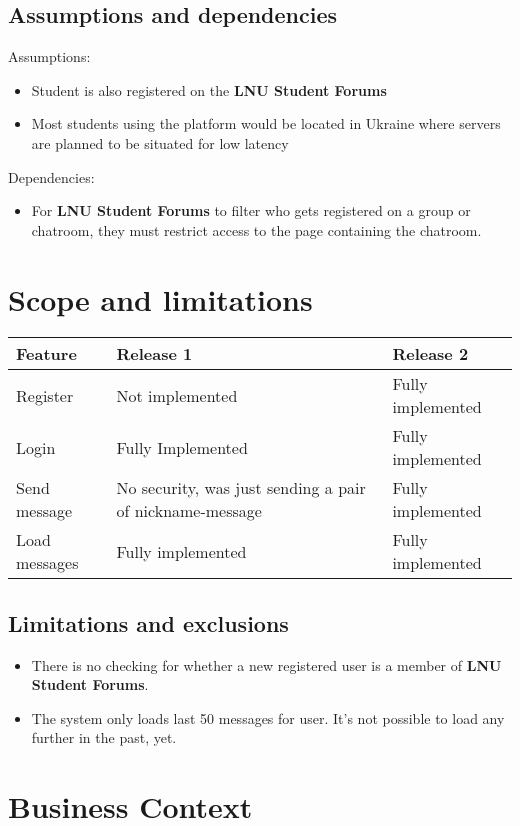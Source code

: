 \documentclass[12pt]{article}
\begin{document}
	\subsection{Assumptions and dependencies}
	Assumptions:
	\begin{itemize}
		\item Student is also registered on the \textbf{LNU Student Forums}
		\item Most students using the platform would be located in Ukraine where servers are planned to be situated for low latency
	\end{itemize}
	Dependencies:
	\begin{itemize}
		\item For \textbf{LNU Student Forums} to filter who gets registered on a group or chatroom, they must restrict access to the page containing the chatroom.
	\end{itemize}
	\section{Scope and limitations}
	\begin{tabular}{|l|p{}|l|}
		\firsthline
		Feature & Release 1 & Release 2 \\ \hline
		Register & Not implemented & Fully implemented \\ \hline
		Login & Fully Implemented & Fully implemented \\ \hline
		Send message & No security, was just sending a pair of nickname-message & Fully implemented \\ \hline
		Load messages & Fully implemented & Fully implemented
		\\ \hline
	\end{tabular}
	\subsection{Limitations and exclusions}
	\begin{itemize}
	\item There is no checking for whether a new registered user is a member of \textbf{LNU Student Forums}. 
	\item The system only loads last 50 messages for user. It's not possible to load any further in the past, yet.
	\end{itemize}
	\section{Business Context}
\end{document}

